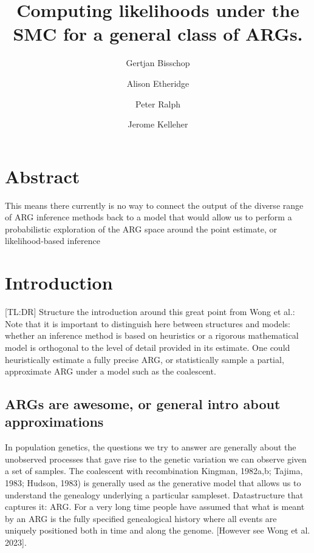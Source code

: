\documentclass{article}
\begin{document}
\linenumbers
\title{Computing likelihoods under the SMC for a general class of ARGs.}

\author[1, $\dagger$]{Gertjan Bisschop}

\author[2]{Alison Etheridge}
\author[3]{Peter Ralph}

\author[1]{Jerome Kelleher}

\maketitle


\section{Abstract}
This means there currently is no way to connect the output of the diverse 
range of ARG inference methods back 
to a model that would allow us to perform a probabilistic exploration of the 
ARG space around the point estimate, or likelihood-based inference

\section{Introduction}

[TL:DR] Structure the introduction around this great point from Wong et al.:
Note that it is important to distinguish here between structures and models: 
whether an inference method is based on 
heuristics or a rigorous mathematical model is orthogonal to the level 
of detail provided in its estimate. One could heuristically estimate a 
fully precise ARG, or statistically sample a partial, approximate ARG under 
a model such as the coalescent.


\subsection{ARGs are awesome, or general intro about approximations}

In population genetics, the questions we try to answer are generally 
about the unobserved processes that gave rise to the genetic variation 
we can observe given a set of samples. 
The coalescent with recombination 
Kingman, 1982a,b; Tajima, 1983; Hudson, 1983) is generally used as 
the generative model that allows us to understand the genealogy 
underlying a particular sampleset. 
Datastructure that captures it: ARG.
For a very long time people have assumed that what is meant by an ARG is the 
fully specified genealogical history  
where all events are uniquely positioned both in time
and along the genome. [However see Wong et al. 2023]. 
\end{document}
